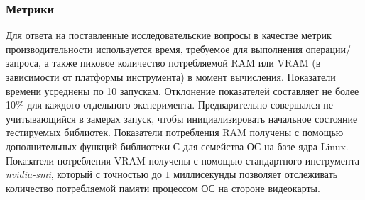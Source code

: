 \begin{table}
\begin{center}
\caption{RDF графы и графы программ для КС запросов}
\label{table:graphs_for_cfpq}
\scriptsize
{}
\end{center}
\end{table}

\subsubsection*{Метрики}

Для ответа на поставленные исследовательские вопросы в качестве метрик производительности используется время, требуемое для выполнения операции/запроса, а также пиковое количество потребляемой RAM или VRAM (в зависимости от платформы инструмента) в момент вычисления. 
Показатели времени усреднены по 10 запускам. 
Отклонение показателей составляет не более 10\% для каждого отдельного эксперимента.
Предварительно совершался не учитывающийся в замерах запуск, чтобы инициализировать начальное состояние тестируемых библиотек. 
Показатели потребления RAM получены с помощью дополнительных функций библиотеки С для семейства ОС на базе ядра Linux.  
Показатели потребления VRAM получены с помощью стандартного инструмента \textit{nvidia-smi}, который с точностью до $1$ миллисекунды позволяет отслеживать количество потребляемой памяти процессом ОС на стороне видеокарты. 

